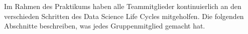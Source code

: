 

Im Rahmen des Praktikums haben alle Teammitglieder kontinuierlich an den verschieden Schritten des Data Science Life Cycles mitgeholfen. Die folgenden Abschnitte beschreiben, was jedes Gruppenmitglied gemacht hat.





